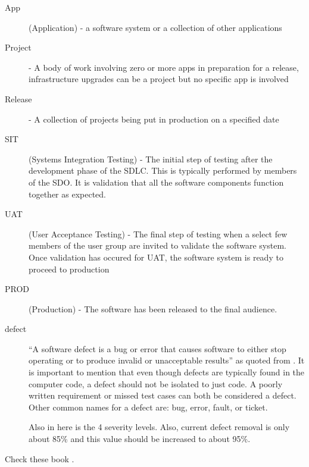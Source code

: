 \documentclass[SDSUThesis.tex]{subfiles}
\begin{document}
\begin{description}

    \item[App] (Application) - a software system or a collection of other applications 
    \item[Project] - A body of work involving zero or more apps in preparation for a release, infrastructure upgrades can be a project but no specific app is involved
    \item[Release] - A collection of projects being put in production on a specified date
    \item[SIT]   (Systems Integration Testing) - The initial step of testing
        after the development phase of the SDLC.  This is typically 
        performed by members of the SDO.  It is validation that all the
        software components function together as expected.
    \item[UAT]   (User Acceptance Testing) - The final step of testing
        when a select few members of the user group are invited to
        validate the software system. Once validation has occured for
        UAT, the software system is ready to proceed to production
    \item[PROD]  (Production) - The software has been released to the final audience.
    \item[defect] ``A software defect is a bug or error that causes
                software to either stop operating or to produce
                invalid or unacceptable results'' as quoted from
            \cite{Jones2009}.  It is important to mention that even though defects are typically 
            found in the computer code, a defect should not be isolated to just code.   A poorly written requirement or missed test cases can 
            both be considered a defect.  Other common names for a defect are: bug, error, fault, or ticket.
            
              Also in here is the 4 severity levels.  Also, current defect removal is only about 85\% and this value should be increased to about 95\%. 
\end{description}

Check these book \cite{Jones2009, Jones1996, Lee2003}. 
\end{document}
